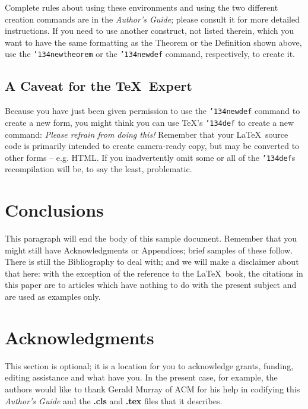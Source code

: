 \documentclass{sig-alternate-sigmod08}
\begin{document}
Complete rules about using these environments and using the
two different creation commands are in the
\textit{Author's Guide}; please consult it for more
detailed instructions.  If you need to use another construct,
not listed therein, which you want to have the same
formatting as the Theorem
or the Definition\cite{salas:calculus} shown above,
use the \texttt{{\char'134}newtheorem} or the
\texttt{{\char'134}newdef} command,
respectively, to create it.

\subsection*{A {\secit Caveat} for the \TeX\ Expert}
Because you have just been given permission to
use the \texttt{{\char'134}newdef} command to create a
new form, you might think you can
use \TeX's \texttt{{\char'134}def} to create a
new command: \textit{Please refrain from doing this!}
Remember that your \LaTeX\ source code is primarily intended
to create camera-ready copy, but may be converted
to other forms -- e.g. HTML. If you inadvertently omit
some or all of the \texttt{{\char'134}def}s recompilation will
be, to say the least, problematic.

\section{Conclusions}
This paragraph will end the body of this sample document.
Remember that you might still have Acknowledgments or
Appendices; brief samples of these
follow.  There is still the Bibliography to deal with; and
we will make a disclaimer about that here: with the exception
of the reference to the \LaTeX\ book, the citations in
this paper are to articles which have nothing to
do with the present subject and are used as
examples only.

\section{Acknowledgments}
This section is optional; it is a location for you
to acknowledge grants, funding, editing assistance and
what have you.  In the present case, for example, the
authors would like to thank Gerald Murray of ACM for
his help in codifying this \textit{Author's Guide}
and the \textbf{.cls} and \textbf{.tex} files that it describes.
\end{document}
